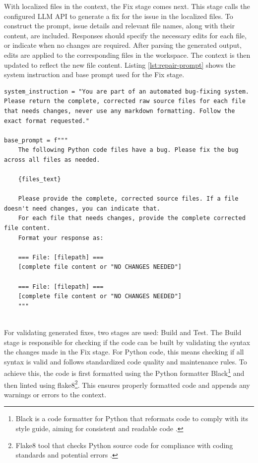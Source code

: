With localized files in the context, the Fix stage comes next. This stage calls the configured \ac{LLM} \ac{API} to generate a fix for the issue in the localized files. To construct the prompt, issue details and relevant file names, along with their content, are included. Responses should specify the necessary edits for each file, or indicate when no changes are required. After parsing the generated output, edits are applied to the corresponding files in the workspace. The context is then updated to reflect the new file content. Listing \ref{lst:repair-prompt} shows the system instruction and base prompt used for the Fix stage.

\begin{lstlisting}[style=python, caption={Repair Prompt}, label={lst:repair-prompt}]
system_instruction = "You are part of an automated bug-fixing system. Please return the complete, corrected raw source files for each file that needs changes, never use any markdown formatting. Follow the exact format requested."

base_prompt = f"""
    The following Python code files have a bug. Please fix the bug across all files as needed.

    {files_text}

    Please provide the complete, corrected source files. If a file doesn't need changes, you can indicate that.
    For each file that needs changes, provide the complete corrected file content.
    Format your response as:

    === File: [filepath] ===
    [complete file content or "NO CHANGES NEEDED"]

    === File: [filepath] ===
    [complete file content or "NO CHANGES NEEDED"]
    """
    
\end{lstlisting}

For validating generated fixes, two stages are used: Build and Test. The Build stage is responsible for checking if the code can be built by validating the syntax  the changes made in the Fix stage.  For Python code, this means checking if all syntax is valid and follows standardized code quality and maintenance rules. To achieve this, the code is first formatted using the Python formatter Black\footnote{Black is a code formatter for Python that reformats code to comply with its style guide, aiming for consistent and readable code \cite{Black2510Documentation}.} and then linted using flake8\footnote{Flake8 tool that checks Python source code for compliance with coding standards and potential errors \cite{Flake8YourTool}.}. This ensures properly formatted code and appends any warnings or errors to the context.

